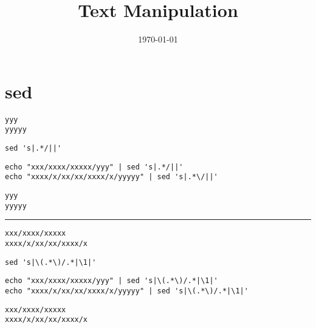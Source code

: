 \documentclass[11pt]{article}
\date{\today}
\title{Text Manipulation}
\begin{document}
\maketitle
\tableofcontents


\section{sed}
\label{sec:org56f9c82}
\begin{verbatim}
yyy
yyyyy
\end{verbatim}

\begin{verbatim}
sed 's|.*/||' 
\end{verbatim}

\begin{verbatim}
echo "xxx/xxxx/xxxxx/yyy" | sed 's|.*/||'
echo "xxxx/x/xx/xx/xxxx/x/yyyyy" | sed 's|.*\/||'
\end{verbatim}


\begin{verbatim}
yyy
yyyyy
\end{verbatim}

\noindent\rule{\textwidth}{0.5pt}


\begin{verbatim}
xxx/xxxx/xxxxx
xxxx/x/xx/xx/xxxx/x
\end{verbatim}


\begin{verbatim}
sed 's|\(.*\)/.*|\1|'
\end{verbatim}


\begin{verbatim}
echo "xxx/xxxx/xxxxx/yyy" | sed 's|\(.*\)/.*|\1|'
echo "xxxx/x/xx/xx/xxxx/x/yyyyy" | sed 's|\(.*\)/.*|\1|'
\end{verbatim}


\begin{verbatim}
xxx/xxxx/xxxxx
xxxx/x/xx/xx/xxxx/x
\end{verbatim}
\end{document}

